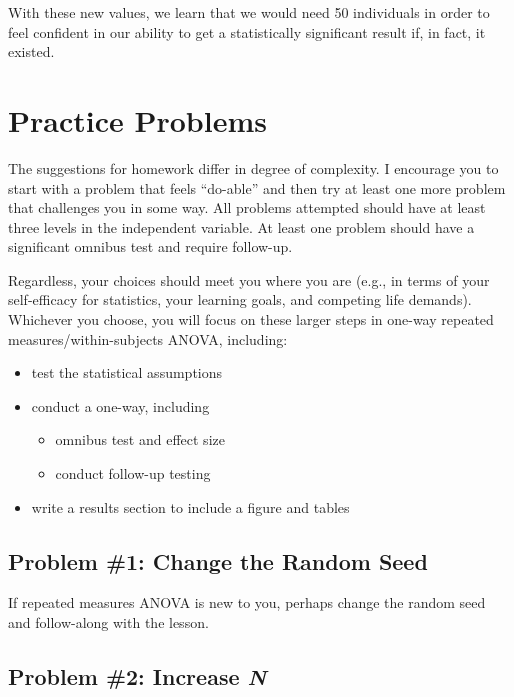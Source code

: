 \documentclass[
  11pt,
]{book}
\providecommand{\tightlist}{%
  \setlength{\itemsep}{0pt}\setlength{\parskip}{0pt}}
\begin{document}
With these new values, we learn that we would need 50 individuals in order to feel confident in our ability to get a statistically significant result if, in fact, it existed.

\hypertarget{practice-problems-7}{%
\section{Practice Problems}\label{practice-problems-7}}

The suggestions for homework differ in degree of complexity. I encourage you to start with a problem that feels ``do-able'' and then try at least one more problem that challenges you in some way. All problems attempted should have at least three levels in the independent variable. At least one problem should have a significant omnibus test and require follow-up.

Regardless, your choices should meet you where you are (e.g., in terms of your self-efficacy for statistics, your learning goals, and competing life demands). Whichever you choose, you will focus on these larger steps in one-way repeated measures/within-subjects ANOVA, including:

\begin{itemize}
\tightlist
\item
  test the statistical assumptions
\item
  conduct a one-way, including

  \begin{itemize}
  \tightlist
  \item
    omnibus test and effect size
  \item
    conduct follow-up testing
  \end{itemize}
\item
  write a results section to include a figure and tables
\end{itemize}

\hypertarget{problem-1-change-the-random-seed-1}{%
\subsection{Problem \#1: Change the Random Seed}\label{problem-1-change-the-random-seed-1}}

If repeated measures ANOVA is new to you, perhaps change the random seed and follow-along with the lesson.

\hypertarget{problem-2-increase-n}{%
\subsection{\texorpdfstring{Problem \#2: Increase \emph{N}}{Problem \#2: Increase N}}\label{problem-2-increase-n}}
\end{document}
